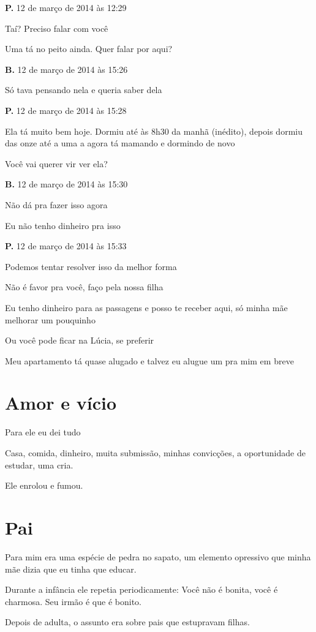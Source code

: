 \textbf{P.} 12 de março de 2014 às 12:29

Taí? Preciso falar com você

Uma tá no peito ainda. Quer falar por aqui?

\textbf{B.} 12 de março de 2014 às 15:26

Só tava pensando nela e queria saber dela

\textbf{P.} 12 de março de 2014 às 15:28

Ela tá muito bem hoje. Dormiu até às 8h30 da manhã (inédito), depois
dormiu das onze até a uma a agora tá mamando e dormindo de novo

Você vai querer vir ver ela?

\textbf{B.} 12 de março de 2014 às 15:30

Não dá pra fazer isso agora

Eu não tenho dinheiro pra isso

\textbf{P.} 12 de março de 2014 às 15:33

Podemos tentar resolver isso da melhor forma

Não é favor pra você, faço pela nossa filha

Eu tenho dinheiro para as passagens e posso te receber aqui, só minha
mãe melhorar um pouquinho

Ou você pode ficar na Lúcia, se preferir

Meu apartamento tá quase alugado e talvez eu alugue um pra mim em breve

\chapter{Amor e vício}

Para ele eu dei tudo

Casa, comida, dinheiro, muita submissão, minhas convicções, a
oportunidade de estudar, uma cria.

Ele enrolou e fumou.

\chapter{Pai}

Para mim era uma espécie de pedra no sapato, um elemento opressivo que
minha mãe dizia que eu tinha que educar.

Durante a infância ele repetia periodicamente: Você não é bonita, você é
charmosa. Seu irmão é que é bonito.

Depois de adulta, o assunto era sobre pais que estupravam filhas.

